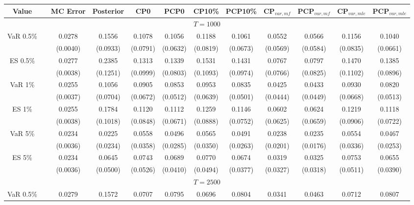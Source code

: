 { \tiny 
{ \renewcommand{\arraystretch}{1.1} 
\begin{sidewaystable} 
\center 
\begin{tabular}{cc cc | cccc | cccc} 
Value && MC Error & Posterior & CP0  & PCP0 & CP10\%  & PCP10\% &CP$_{var,mf}$ & PCP$_{var,mf}$ & CP$_{var,mle}$ & PCP$_{var,mle }$\\ \hline 
\hline 
\multicolumn{12}{c}{$T =1000$}  \\ 
\hline 
\rowcolor{LightCyan} 
VaR 0.5\% && 0.0278 & 0.1556 & 0.1078 & 0.1056 & 0.1188 & 0.1061 &0.0552 & 0.0566 & 0.1156 & 0.1040 \\ 
  && (0.0040) & (0.0933) & (0.0791) & (0.0632) & (0.0819) & (0.0673) &(0.0569) & (0.0584) & (0.0835) & (0.0661) \\ 
\rowcolor{LightCyan} 
ES 0.5\% && 0.0277 & 0.2385 & 0.1313 & 0.1339 & 0.1531 & 0.1431 &0.0767 & 0.0797 & 0.1470 & 0.1385 \\ 
  && (0.0038) & (0.1251) & (0.0999) & (0.0803) & (0.1093) & (0.0974) &(0.0766) & (0.0825) & (0.1102) & (0.0896) \\ [1ex] 
\rowcolor{LightCyan} 
VaR 1\% && 0.0255 & 0.1056 & 0.0905 & 0.0853 & 0.0953 & 0.0835 &0.0425 & 0.0433 & 0.0930 & 0.0820 \\   
 && (0.0037) & (0.0704) & (0.0672) & (0.0512) & (0.0639) & (0.0501) &(0.0444) & (0.0449) & (0.0668) & (0.0513) \\  
\rowcolor{LightCyan} 
ES 1\% && 0.0255 & 0.1784 & 0.1120 & 0.1112 & 0.1259 & 0.1146 &0.0602 & 0.0624 & 0.1219 & 0.1118 \\ 
  && (0.0038) & (0.1018) & (0.0848) & (0.0671) & (0.0888) & (0.0752) &(0.0625) & (0.0659) & (0.0906) & (0.0722) \\ [1ex]
\rowcolor{LightCyan} 
VaR 5\% && 0.0234 & 0.0225 & 0.0558 & 0.0496 & 0.0565 & 0.0491 &0.0238 & 0.0235 & 0.0554 & 0.0467 \\ 
  && (0.0036) & (0.0234) & (0.0358) & (0.0285) & (0.0350) & (0.0263) &(0.0201) & (0.0176) & (0.0336) & (0.0253) \\ 
\rowcolor{LightCyan} 
ES 5\% && 0.0234 & 0.0645 & 0.0743 & 0.0689 & 0.0770 & 0.0674 &0.0319 & 0.0325 & 0.0753 & 0.0655 \\ 
 && (0.0036) & (0.0500) & (0.0526) & (0.0410) & (0.0494) & (0.0377) &(0.0327) & (0.0318) & (0.0511) & (0.0390) \\ 
\hline 
\multicolumn{12}{c}{$T =2500$}  \\ 
\hline 
\rowcolor{LightCyan} 
VaR 0.5\% && 0.0279 & 0.1572 & 0.0707 & 0.0795 & 0.0696 & 0.0804 &0.0341 & 0.0463 & 0.0712 & 0.0807 \\ 

\end{tabular}
\end{sidewaystable}}}
